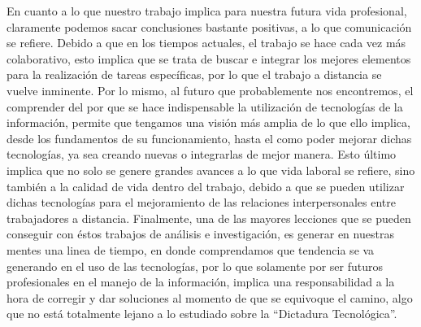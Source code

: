 En cuanto a lo que nuestro trabajo implica para nuestra futura vida profesional, 
claramente podemos sacar conclusiones bastante positivas, a lo que comunicación
se refiere. Debido a que en los tiempos actuales, el trabajo se hace cada vez más 
colaborativo, esto implica que se trata de buscar e integrar los mejores elementos
para la realización de tareas específicas, por lo que el trabajo a distancia se vuelve
inminente. Por lo mismo, al futuro que probablemente nos encontremos, el comprender del 
por que se hace indispensable la utilización de tecnologías de la información, permite que
tengamos una visión más amplia de lo que ello implica, desde los fundamentos de su funcionamiento, hasta
el como poder mejorar dichas tecnologías, ya sea creando nuevas o integrarlas de mejor manera. Esto último
implica que no solo se genere grandes avances a lo que vida laboral se refiere, sino también a la calidad de 
vida dentro del trabajo, debido a que se pueden utilizar dichas tecnologías para el mejoramiento de las relaciones
interpersonales entre trabajadores a distancia. Finalmente, una de las mayores lecciones que se pueden conseguir con
éstos trabajos de análisis e investigación, es generar en nuestras mentes una linea de tiempo, en donde comprendamos que
tendencia se va generando en el uso de las tecnologías, por lo que solamente por ser futuros profesionales en el manejo 
de la información, implica una responsabilidad a la hora de corregir y dar soluciones al momento de que se equivoque el
camino, algo que no está totalmente lejano a lo estudiado sobre la ``Dictadura Tecnológica''.

